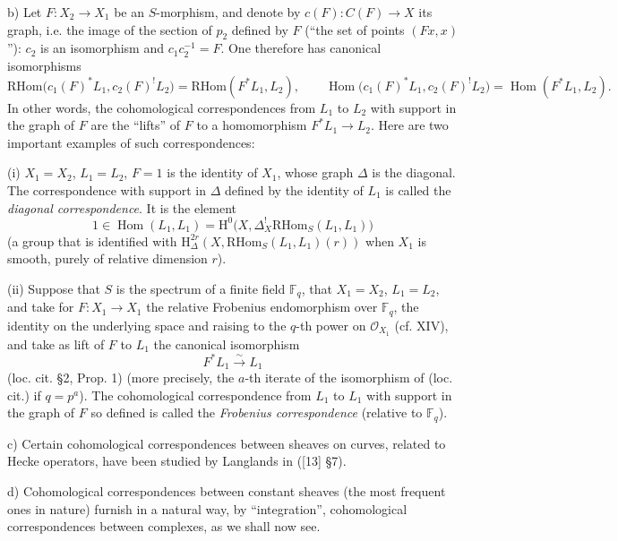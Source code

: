 \documentclass[11pt]{article}
\renewcommand{\H}{\mathrm{H}}
\DeclareMathOperator{\Hom}{Hom}
\providecommand{\RHom}{\mathrm{RHom}}
\providecommand{\RHom}{\mathrm{RHom}}
\providecommand{\Hom}{\operatorname{Hom}}
\providecommand{\RHom}{\mathrm R\mathcal{H}om}
\providecommand{\RHom}{\mathrm{RHom}}
\begin{document}
b) Let $F:X_2\to X_1$ be an $S$-morphism, and denote by $c(F):C(F)\to X$ its graph, i.e. the image of the section of $p_2$ defined by $F$ (``the set of points $(Fx,x)$''): $c_2$ is an isomorphism and $c_1c_2^{-1}=F$. One therefore has canonical isomorphisms
\begin{equation}
\RHom\bigl(c_1(F)^*L_1,c_2(F)^!L_2\bigr)=\RHom(F^*L_1,L_2),
\qquad
\Hom\bigl(c_1(F)^*L_1,c_2(F)^!L_2\bigr)=\Hom(F^*L_1,L_2).
\tag{3.2.6}
\end{equation}
In other words, the cohomological correspondences from $L_1$ to $L_2$ with support in the graph of $F$ are the ``lifts'' of $F$ to a homomorphism $F^*L_1\to L_2$. Here are two important examples of such correspondences:

(i) $X_1=X_2$, $L_1=L_2$, $F=1$ is the identity of $X_1$, whose graph $\Delta$ is the diagonal. The correspondence with support in $\Delta$ defined by the identity of $L_1$ is called the \emph{diagonal correspondence}. It is the element
\[
1\in \Hom(L_1,L_1)=\H^0\bigl(X,\Delta_X^!\RHom_S(L_1,L_1)\bigr)
\]
(a group that is identified with $\H^{2r}_\Delta(X,\RHom_S(L_1,L_1)(r))$ when $X_1$ is smooth, purely of relative dimension $r$).

(ii) Suppose that $S$ is the spectrum of a finite field $\mathbb F_q$, that $X_1=X_2$, $L_1=L_2$, and take for $F:X_1\to X_1$ the relative Frobenius endomorphism over $\mathbb F_q$, the identity on the underlying space and raising to the $q$-th power on $\mathcal O_{X_1}$ (cf. XIV), and take as lift of $F$ to $L_1$ the canonical isomorphism
\[
F^*L_1\xrightarrow{\sim}L_1
\]
(loc. cit. §2, Prop. 1) (more precisely, the $a$-th iterate of the isomorphism of (loc. cit.) if $q=p^a$). The cohomological correspondence from $L_1$ to $L_1$ with support in the graph of $F$ so defined is called the \emph{Frobenius correspondence} (relative to $\mathbb F_q$).

c) Certain cohomological correspondences between sheaves on curves, related to Hecke operators, have been studied by Langlands in ([13] §7).

d) Cohomological correspondences between constant sheaves (the most frequent ones in nature) furnish in a natural way, by ``integration'', cohomological correspondences between complexes, as we shall now see.
\end{document}

